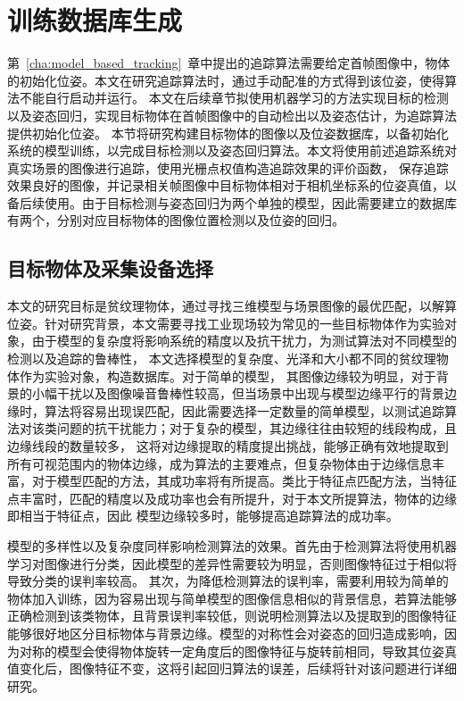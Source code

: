 \section{训练数据库生成}
\label{sec:train_dataset}
第~\ref{cha:model_based_tracking}~章中提出的追踪算法需要给定首帧图像中，物体的初始化位姿。本文在研究追踪算法时，通过手动配准的方式得到该位姿，使得算法不能自行启动并运行。
本文在后续章节拟使用机器学习的方法实现目标的检测以及姿态回归，实现目标物体在首帧图像中的自动检出以及姿态估计，为追踪算法提供初始化位姿。
本节将研究构建目标物体的图像以及位姿数据库，以备初始化系统的模型训练，以完成目标检测以及姿态回归算法。本文将使用前述追踪系统对真实场景的图像进行追踪，使用光栅点权值构造追踪效果的评价函数，
保存追踪效果良好的图像，并记录相关帧图像中目标物体相对于相机坐标系的位姿真值，以备后续使用。由于目标检测与姿态回归为两个单独的模型，因此需要建立的数据库有两个，分别对应目标物体的图像位置检测以及位姿的回归。
\subsection{目标物体及采集设备选择}
\label{sec:dataset_model}
本文的研究目标是贫纹理物体，通过寻找三维模型与场景图像的最优匹配，以解算位姿。针对研究背景，本文需要寻找工业现场较为常见的一些目标物体作为实验对象，由于模型的复杂度将影响系统的精度以及抗干扰力，为测试算法对不同模型的检测以及追踪的鲁棒性，
本文选择模型的复杂度、光泽和大小都不同的贫纹理物体作为实验对象，构造数据库。对于简单的模型，
其图像边缘较为明显，对于背景的小幅干扰以及图像噪音鲁棒性较高，但当场景中出现与模型边缘平行的背景边缘时，算法将容易出现误匹配，因此需要选择一定数量的简单模型，以测试追踪算法对该类问题的抗干扰能力；对于复杂的模型，其边缘往往由较短的线段构成，且边缘线段的数量较多，
这将对边缘提取的精度提出挑战，能够正确有效地提取到所有可视范围内的物体边缘，成为算法的主要难点，但复杂物体由于边缘信息丰富，对于模型匹配的方法，其成功率将有所提高。类比于特征点匹配方法，当特征点丰富时，匹配的精度以及成功率也会有所提升，对于本文所提算法，物体的边缘即相当于特征点，因此
模型边缘较多时，能够提高追踪算法的成功率。

模型的多样性以及复杂度同样影响检测算法的效果。首先由于检测算法将使用机器学习对图像进行分类，因此模型的差异性需要较为明显，否则图像特征过于相似将导致分类的误判率较高。
其次，为降低检测算法的误判率，需要利用较为简单的物体加入训练，因为容易出现与简单模型的图像信息相似的背景信息，若算法能够正确检测到该类物体，且背景误判率较低，则说明检测算法以及提取到的图像特征
能够很好地区分目标物体与背景边缘。模型的对称性会对姿态的回归造成影响，因为对称的模型会使得物体旋转一定角度后的图像特征与旋转前相同，导致其位姿真值变化后，图像特征不变，这将引起回归算法的误差，后续将针对该问题进行详细研究。

